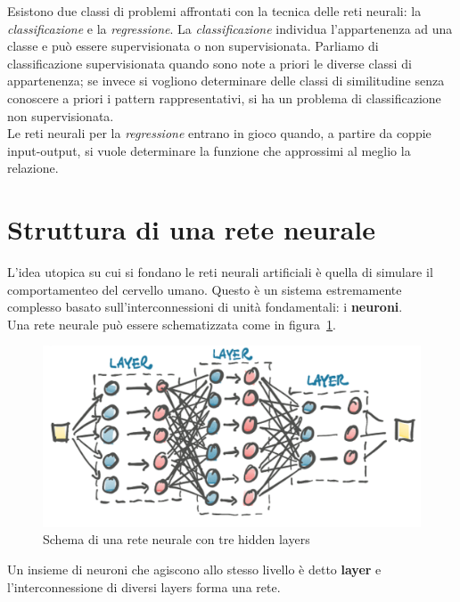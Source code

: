 \documentclass[12pt,a4paper,final]{book}
\begin{document}
	Esistono due classi di problemi affrontati con la tecnica delle reti neurali: la \textit {classificazione} e la \textit {regressione}.
La \textit {classificazione} individua l'appartenenza ad una classe e può essere supervisionata o non supervisionata. Parliamo di classificazione supervisionata quando sono note a priori le diverse classi di appartenenza; se invece si vogliono determinare delle classi di similitudine senza conoscere a priori i pattern rappresentativi, si ha un problema di classificazione non supervisionata. \\
Le reti neurali per la \textit {regressione} entrano in gioco quando, a partire da coppie input-output, si vuole determinare la funzione che approssimi al meglio la relazione.


\section{Struttura di una rete neurale}
L'idea utopica su cui si fondano le reti neurali artificiali è quella di simulare il comportamenteo del cervello umano. Questo è un sistema estremamente complesso basato sull'interconnessioni di unità fondamentali: i \textbf {neuroni}. \\
Una rete neurale può essere schematizzata come in figura~\ref{schema_rete}.
\begin{figure}
	\centering
	\includegraphics[scale=0.3]{../figures/schema_rete.jpg}
	\caption{Schema di una rete neurale con tre hidden layers\cite{stevens}}
	\label{schema_rete}
\end{figure}
Un insieme di neuroni che agiscono allo stesso livello è detto \textbf {layer} e l'interconnessione di diversi layers forma una rete.




\end{document}
